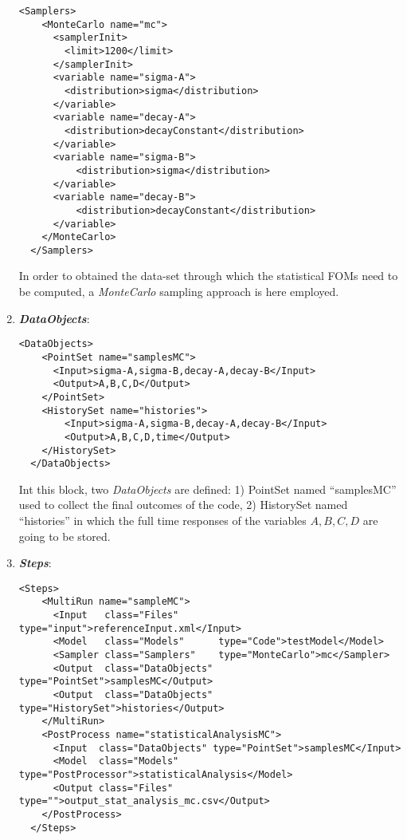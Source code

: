 \begin{enumerate}
\begin{lstlisting}[style=XML,morekeywords={arg,extension,pauseAtEnd,overwrite}]
  <Samplers>
    <MonteCarlo name="mc">
      <samplerInit>
        <limit>1200</limit>
      </samplerInit>
      <variable name="sigma-A">
        <distribution>sigma</distribution>
      </variable>
      <variable name="decay-A">
        <distribution>decayConstant</distribution>
      </variable>
      <variable name="sigma-B">
          <distribution>sigma</distribution>
      </variable>
      <variable name="decay-B">
          <distribution>decayConstant</distribution>
      </variable>
    </MonteCarlo>
  </Samplers>
\end{lstlisting}
  In order to obtained the data-set through which the statistical FOMs need to be computed, a \textit{MonteCarlo} sampling approach is here employed.
   \item \textbf{\textit{DataObjects}}:
\begin{lstlisting}[style=XML,morekeywords={arg,extension,pauseAtEnd,overwrite}]
  <DataObjects>
    <PointSet name="samplesMC">
      <Input>sigma-A,sigma-B,decay-A,decay-B</Input>
      <Output>A,B,C,D</Output>
    </PointSet>
    <HistorySet name="histories">
        <Input>sigma-A,sigma-B,decay-A,decay-B</Input>
        <Output>A,B,C,D,time</Output>
    </HistorySet>
  </DataObjects>
\end{lstlisting}
  Int this block, two \textit{DataObjects} are defined: 
  1) PointSet named ``samplesMC'' used to collect the final outcomes of 
  the code, 
  2) HistorySet named ``histories'' in which the full time responses of the 
  variables $A,B,C,D$ are going to be stored.

   \item \textbf{\textit{Steps}}:   
\begin{lstlisting}[style=XML,morekeywords={arg,extension,pauseAtEnd,overwrite}]
  <Steps>
    <MultiRun name="sampleMC">
      <Input   class="Files"       type="input">referenceInput.xml</Input>
      <Model   class="Models"      type="Code">testModel</Model>
      <Sampler class="Samplers"    type="MonteCarlo">mc</Sampler>
      <Output  class="DataObjects" type="PointSet">samplesMC</Output>
      <Output  class="DataObjects" type="HistorySet">histories</Output>
    </MultiRun>
    <PostProcess name="statisticalAnalysisMC">
      <Input  class="DataObjects" type="PointSet">samplesMC</Input>
      <Model  class="Models"      type="PostProcessor">statisticalAnalysis</Model>
      <Output class="Files"       type="">output_stat_analysis_mc.csv</Output>
    </PostProcess>
  </Steps>
\end{lstlisting}


\end{enumerate}
